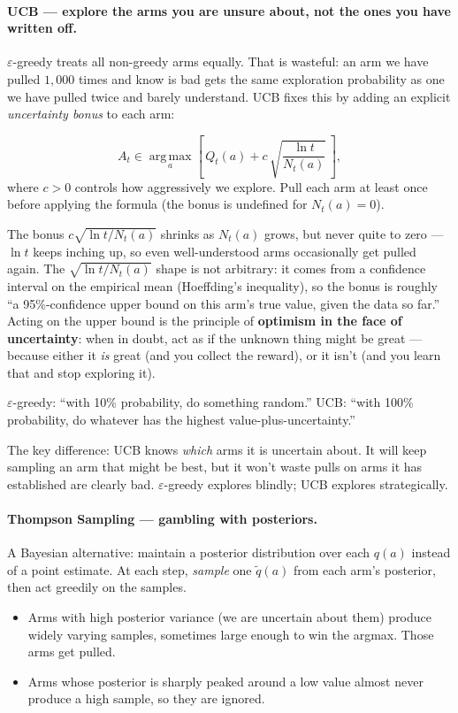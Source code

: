 \documentclass[11pt, oneside]{book}
\newcommand{\argmax}{\operatorname*{arg\,max}}
\begin{document}
\paragraph{UCB --- explore the arms you are unsure about, not the ones you have written off.}
$\varepsilon$-greedy treats all non-greedy arms equally. That is wasteful: an arm we
have pulled $1{,}000$ times and know is bad gets the same exploration probability as
one we have pulled twice and barely understand.
UCB fixes this by adding an explicit \emph{uncertainty bonus} to each arm:

\begin{thmbox}[title={UCB Action Selection}]
\[
  A_t \in \argmax_{a} \left[\, Q_t(a) + c\, \sqrt{\frac{\ln t}{N_t(a)}}\, \right],
\]
where $c > 0$ controls how aggressively we explore.
Pull each arm at least once before applying the formula (the bonus is undefined for $N_t(a) = 0$).
\end{thmbox}

The bonus $c\sqrt{\ln t / N_t(a)}$ shrinks as $N_t(a)$ grows, but never quite to zero
--- $\ln t$ keeps inching up, so even well-understood arms occasionally get pulled
again.
The $\sqrt{\ln t / N_t(a)}$ shape is not arbitrary: it comes from a confidence
interval on the empirical mean (Hoeffding's inequality), so the bonus is roughly
``a 95\%-confidence upper bound on this arm's true value, given the data so far.''
Acting on the upper bound is the principle of \textbf{optimism in the face of
uncertainty}: when in doubt, act as if the unknown thing might be great --- because
either it \emph{is} great (and you collect the reward), or it isn't (and you learn
that and stop exploring it).

\begin{intbox}[title={Why UCB beats $\varepsilon$-greedy}]
$\varepsilon$-greedy: ``with 10\% probability, do something random.''
UCB: ``with 100\% probability, do whatever has the highest value-plus-uncertainty.''

The key difference: UCB knows \emph{which} arms it is uncertain about. It will keep
sampling an arm that might be best, but it won't waste pulls on arms it has
established are clearly bad. $\varepsilon$-greedy explores blindly; UCB explores
strategically.
\end{intbox}

\paragraph{Thompson Sampling --- gambling with posteriors.}
A Bayesian alternative: maintain a posterior distribution over each $q(a)$ instead of
a point estimate. At each step, \emph{sample} one $\tilde q(a)$ from each arm's
posterior, then act greedily on the samples.
\begin{itemize}
  \item Arms with high posterior variance (we are uncertain about them) produce widely
    varying samples, sometimes large enough to win the argmax. Those arms get pulled.
  \item Arms whose posterior is sharply peaked around a low value almost never produce
    a high sample, so they are ignored.
\end{itemize}
\end{document}
